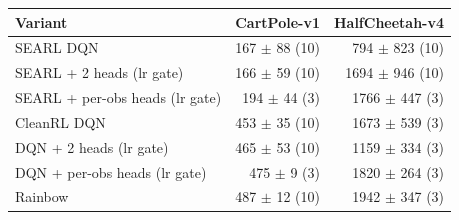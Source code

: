 \begin{tabular}{lrr}
\toprule
Variant & CartPole-v1 & HalfCheetah-v4 \\
\midrule
SEARL DQN & 167 $\pm$ 88 (10) & 794 $\pm$ 823 (10) \\
SEARL + 2 heads (lr gate) & 166 $\pm$ 59 (10) & 1694 $\pm$ 946 (10) \\
SEARL + per-obs heads (lr gate) & 194 $\pm$ 44 (3) & 1766 $\pm$ 447 (3) \\
\midrule
CleanRL DQN & 453 $\pm$ 35 (10) & 1673 $\pm$ 539 (3) \\
DQN + 2 heads (lr gate) & 465 $\pm$ 53 (10) & 1159 $\pm$ 334 (3) \\
DQN + per-obs heads (lr gate) & 475 $\pm$ 9 (3) & 1820 $\pm$ 264 (3) \\
\midrule
Rainbow & 487 $\pm$ 12 (10) & 1942 $\pm$ 347 (3) \\
\bottomrule
\end{tabular}
